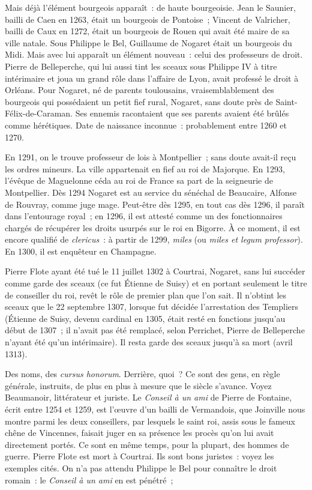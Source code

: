 \documentclass[french,twoside]{book} %
\begin{document}
Mais déjà l’élément bourgeois apparaît : de haute bourgeoisie. Jean le Saunier, bailli de Caen en 1263, était un bourgeois de Pontoise ; Vincent de Valricher, bailli de Caux en 1272, était un bourgeois de Rouen qui avait été maire de sa ville natale. Sous Philippe le Bel, Guillaume de Nogaret était un bourgeois du Midi. Mais avec lui apparaît un élément nouveau : celui des professeurs de droit. Pierre de Belleperche, qui lui aussi tint les sceaux sous Philippe IV à titre intérimaire et joua un grand rôle dans l’affaire de Lyon, avait professé le droit à Orléans. Pour Nogaret, né de parents toulousains, vraisemblablement des bourgeois qui possédaient un petit fief rural, Nogaret, sans doute près de Saint-Félix-de-Caraman. Ses ennemis racontaient que ses parents avaient été brûlés comme hérétiques. Date de naissance inconnue : probablement entre 1260 et 1270.\par
En 1291, on le trouve professeur de lois à Montpellier ; sans doute avait-il reçu les ordres mineurs. La ville appartenait en fief au roi de Majorque. En 1293, l’évêque de Maguelonne céda au roi de France sa part de la seigneurie de Montpellier. Dès 1294 Nogaret est au service du sénéchal de Beaucaire, Alfonse de Rouvray, comme juge mage. Peut-être dès 1295, en tout cas dès 1296, il paraît dans l’entourage royal ; en 1296, il est attesté comme un des fonctionnaires chargés de récupérer les droits usurpés sur le roi en Bigorre. À ce moment, il est encore qualifié de {\itshape clericus} : à partir de 1299, {\itshape miles} (ou {\itshape miles et legum professor}). En 1300, il est enquêteur en Champagne.\par
Pierre Flote ayant été tué le 11 juillet 1302 à Courtrai, Nogaret, sans lui succéder comme garde des sceaux (ce fut Étienne de Suisy) et en portant seulement le titre de conseiller du roi, revêt le rôle de premier plan que l’on sait. Il n’obtint les sceaux que le 22 septembre 1307, lorsque fut décidée l’arrestation des Templiers (Étienne de Suisy, devenu cardinal en 1305, était resté en fonctions jusqu’au début de 1307 ; il n’avait pas été remplacé, selon Perrichet, Pierre de Belleperche n’ayant été qu’un intérimaire). Il resta garde des sceaux jusqu’à sa mort (avril 1313).\par
Des noms, des {\itshape cursus honorum}. Derrière, quoi ? Ce sont des gens, en règle générale, instruits, de plus en plus à mesure que le siècle s’avance. Voyez Beaumanoir, littérateur et juriste. Le {\itshape Conseil à un ami} de Pierre de Fontaine, écrit entre 1254 et 1259, est l’œuvre d’un bailli de Vermandois, que Joinville nous montre parmi les deux conseillers, par lesquels le saint roi, assis sous le fameux chêne de Vincennes, faisait juger en sa présence les procès qu’on lui avait directement portés. Ce sont en même temps, pour la plupart, des hommes de guerre. Pierre Flote est mort à Courtrai. Ils sont bons juristes : voyez les exemples cités. On n’a pas attendu Philippe le Bel pour connaître le droit romain : le {\itshape Conseil à un ami} en est pénétré ;  
\end{document}
